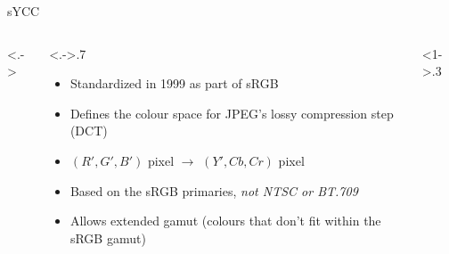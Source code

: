 \documentclass[aspectratio=169,handout,usepdftitle=false]{fireshonks}
\begin{document}
\begin{frame}{sYCC}
    \begin{columns}<.->
        \begin{column}<.->{.7\textwidth}
            \begin{itemize}
                \item Standardized in 1999 as part of sRGB \autocite{srgb2002}
                \item Defines the colour space for JPEG's lossy compression step (DCT)
                \item $(R', G', B')$ pixel $\rightarrow$ $(Y', Cb, Cr)$ pixel
                \item Based on the sRGB primaries, \emph{not NTSC or BT.709}
                \item Allows extended gamut (colours that don't fit within the sRGB gamut)
            \end{itemize}
        \end{column}
        \begin{column}<1->{.3\textwidth}
        \end{column}
    \end{columns}
\end{frame}
\end{document}
